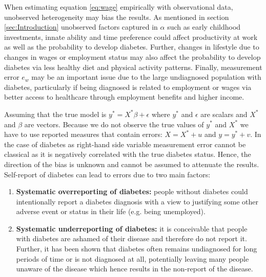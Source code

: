 \documentclass[12pt,english,british]{article}
\begin{document}
When estimating equation  \ref{eq:wage} empirically with observational data, unobserved heterogeneity may bias the results. As mentioned in section  \ref{sec:Introduction} unobserved factors captured in $\alpha$ such as early childhood investments, innate ability and time preference could affect productivity at work as well as the probability to develop diabetes. Further, changes in lifestyle due to changes in wages or employment status may also affect the probability to develop diabetes via  less healthy diet and physical activity patterns. Finally, measurement error $e_w$ may be an important issue due to the large undiagnosed population with diabetes, particularly if being diagnosed is related to employment or wages via better access to healthcare through employment benefits and higher income.

Assuming that the true model is $y^{*}=X^{*}\beta+\epsilon$ where $y^{*}$ and $\epsilon$ are scalars and $X^{*}$ and $\beta$ are vectors. Because we do not observe the true values of $y^{*}$ and $X^{*}$  we have to use reported measures that contain errors: $X=X^{*} + u$ and $y=y^{*} + v$. In the case of diabetes as right-hand side variable measurement error cannot be classical as it is negatively correlated with the true diabetes status. Hence, the direction of the bias is unknown and cannot be assumed to attenuate the results.
Self-report of diabetes can lead to errors due to two main factors: 
\begin{enumerate}
\item \textbf{Systematic overreporting of diabetes:} people without diabetes
could intentionally report a diabetes diagnosis with a view to justifying
some other adverse event or status in their life (e.g. being unemployed). 
\item \textbf{Systematic underreporting of diabetes:} it is conceivable
that people with diabetes are ashamed of their disease and therefore
do not report it. Further, it has been shown that diabetes often remains
undiagnosed for long periods of time or is not diagnosed at all, potentially
leaving many people unaware of the disease which hence results in
the non-report of the disease.
\end{enumerate} 
\end{document}
